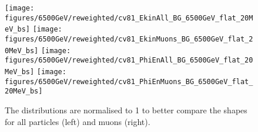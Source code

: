 \begin{figure}
\begin{center}
  \texttt{[image: figures/6500GeV/reweighted/cv81\_EkinAll\_BG\_6500GeV\_flat\_20MeV\_bs]}
  \texttt{[image: figures/6500GeV/reweighted/cv81\_EkinMuons\_BG\_6500GeV\_flat\_20MeV\_bs]}
  \texttt{[image: figures/6500GeV/reweighted/cv81\_PhiEnAll\_BG\_6500GeV\_flat\_20MeV\_bs]}
  \texttt{[image: figures/6500GeV/reweighted/cv81\_PhiEnMuons\_BG\_6500GeV\_flat\_20MeV\_bs]}
\end{center}
\vspace{-0.6cm}
 \caption{The distributions are normalised to 1 to better compare the shapes for all particles (left) and muons (right).
  \label{fig:EkinPhiEn6p5}}
\end{figure}
